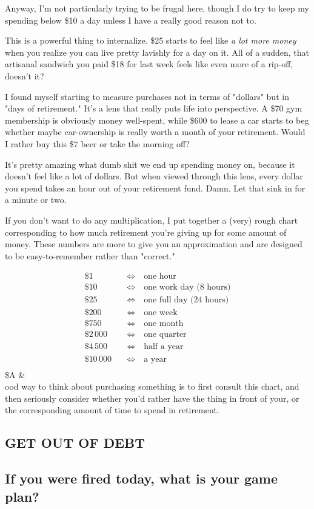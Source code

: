 \documentclass[../the-millions-of-gestures.tex]{subfiles}
\begin{document}
Anyway,  I'm not particularly trying to be frugal
here, though I do try to keep my spending below \$10 a day unless I have a
really good reason not to.

This is a powerful thing to internalize. \$25 starts to feel like \emph{a lot
more money} when you realize you can live pretty lavishly for a day on it. All
of a sudden, that artisanal sandwich you paid \$18 for last week feels like even
more of a rip-off, doesn't it?

I found myself starting to measure purchases not in terms of "dollars" but in
"days of retirement." It's a lens that really puts life into perspective. A \$70
gym membership is obviously money well-spent, while \$600 to lease a car starts
to beg whether maybe car-ownership is really worth a month of your retirement.
Would I rather buy this \$7 beer or take the morning off?

 It's pretty amazing what dumb shit we end up spending
money on, because it doesn't feel like a lot of dollars. But when viewed through
this lens, every dollar you spend takes an hour out of your retirement fund.
Damn. Let that sink in for a minute or two.

If you don't want to do any multiplication, I put together a (very) rough chart
corresponding to how much retirement you're giving up for some amount of money.
These numbers are more to give you an approximation and are designed to be
easy-to-remember rather than "correct."

\newcommand{\xx}[2]{\$#1 &\quad\iff\quad \text{#2}\\}
\begin{align*}
  \xx{1}{one hour}
  \xx{10}{one work day (8 hours)}
  \xx{25}{one full day (24 hours)}
  \xx{200}{one week}
  \xx{750}{one month}
  \xx{2\,000}{one quarter}
  \xx{4\,500}{half a year}
  \xx{10\,000}{a year}
\end{align*}
\undefine\xx

A good way to think about purchasing something is to first consult this chart,
and then seriously consider whether you'd rather have the thing in front of
your, or the corresponding amount of time to spend in retirement.

\subsection{GET OUT OF DEBT}
\subsection{If you were fired today, what is your game plan?}
\end{document}
